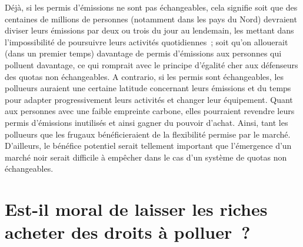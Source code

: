 \documentclass[a5paper,french,openany]{memoir}
\begin{document}
Déjà, si les permis d'émissions ne sont pas échangeables, cela signifie soit que des centaines de millions de personnes (notamment dans les pays du Nord) devraient diviser leurs émissions par deux ou trois du jour au lendemain, les mettant dans l'impossibilité de poursuivre leurs activités quotidiennes~; soit qu'on allouerait (dans un premier temps) davantage de permis d'émissions aux personnes qui polluent davantage, ce qui romprait avec le principe d'égalité cher aux défenseurs des quotas non échangeables. A contrario, si les permis sont échangeables, les pollueurs auraient une certaine latitude concernant leurs émissions et du temps pour adapter progressivement leurs activités et changer leur équipement. Quant aux personnes avec une faible empreinte carbone, elles pourraient revendre leurs permis d'émissions inutilisés et ainsi gagner du pouvoir d'achat. Ainsi, tant les pollueurs que les frugaux bénéficieraient de la flexibilité permise par le marché. D'ailleurs, le bénéfice potentiel serait tellement important que l'émergence d'un marché noir serait difficile à empêcher dans le cas d'un système de quotas non échangeables. 

\section*{\normalsize Est-il moral de laisser les riches acheter des droits à polluer~?}\label{q:moral}
\end{document}
